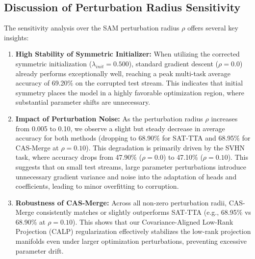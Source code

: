 \documentclass{article}
\begin{document}
\subsection{Discussion of Perturbation Radius Sensitivity}
The sensitivity analysis over the SAM perturbation radius $\rho$ offers several key insights:
\begin{enumerate}
    \item \textbf{High Stability of Symmetric Initializer:} When utilizing the corrected symmetric initialization ($\lambda_{init} = 0.500$), standard gradient descent ($\rho = 0.0$) already performs exceptionally well, reaching a peak multi-task average accuracy of 69.20\% on the corrupted test stream. This indicates that initial symmetry places the model in a highly favorable optimization region, where substantial parameter shifts are unnecessary.
    \item \textbf{Impact of Perturbation Noise:} As the perturbation radius $\rho$ increases from 0.005 to 0.10, we observe a slight but steady decrease in average accuracy for both methods (dropping to 68.90\% for SAT-TTA and 68.95\% for CAS-Merge at $\rho=0.10$). This degradation is primarily driven by the SVHN task, where accuracy drops from 47.90\% ($\rho=0.0$) to 47.10\% ($\rho=0.10$). This suggests that on small test streams, large parameter perturbations introduce unnecessary gradient variance and noise into the adaptation of heads and coefficients, leading to minor overfitting to corruption.
    \item \textbf{Robustness of CAS-Merge:} Across all non-zero perturbation radii, CAS-Merge consistently matches or slightly outperforms SAT-TTA (e.g., 68.95\% vs 68.90\% at $\rho=0.10$). This shows that our Covariance-Aligned Low-Rank Projection (CALP) regularization effectively stabilizes the low-rank projection manifolds even under larger optimization perturbations, preventing excessive parameter drift.
\end{enumerate}
\end{document}
